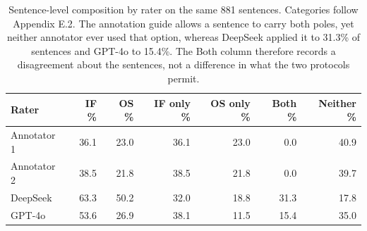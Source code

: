 \begin{table}[t]
\centering
\small
\caption{Sentence-level composition by rater on the same 881 sentences. Categories follow Appendix E.2. The annotation guide allows a sentence to carry both poles, yet neither annotator ever used that option, whereas DeepSeek applied it to 31.3\% of sentences and GPT-4o to 15.4\%. The Both column therefore records a disagreement about the sentences, not a difference in what the two protocols permit.}
\label{tab:human_composition}
\begin{tabular}{lrrrrrr}
\toprule
Rater & IF \% & OS \% & IF only \% & OS only \% & Both \% & Neither \% \\
\midrule
Annotator 1 & 36.1 & 23.0 & 36.1 & 23.0 & 0.0 & 40.9 \\
Annotator 2 & 38.5 & 21.8 & 38.5 & 21.8 & 0.0 & 39.7 \\
DeepSeek & 63.3 & 50.2 & 32.0 & 18.8 & 31.3 & 17.8 \\
GPT-4o & 53.6 & 26.9 & 38.1 & 11.5 & 15.4 & 35.0 \\
\bottomrule
\end{tabular}
\end{table}
